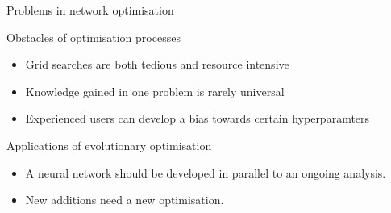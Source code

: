 \begin{frame}{Problems in network optimisation}
    \begin{block}{Obstacles of optimisation processes}
        \begin{itemize}
            \item Grid searches are both tedious and resource intensive
            \item Knowledge gained in one problem is rarely universal
            \item Experienced users can develop a bias towards certain hyperparamters
        \end{itemize}
    \end{block}
    \begin{block}{Applications of evolutionary optimisation}
        \begin{itemize}
            \item A neural network should be developed in parallel to an ongoing analysis.
            \item New additions need a new optimisation.
        \end{itemize}
    \end{block}
\end{frame}


